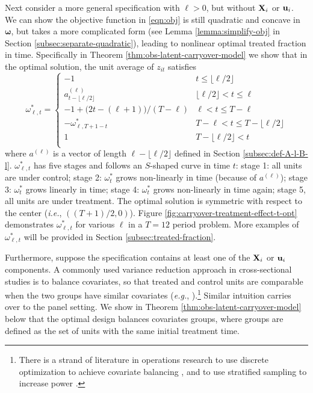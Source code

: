 {	

Next consider a more general specification with $\ell > 0$, but without $\mathbf{X}_i$ or $\mathbf{u}_i$. We can show the objective function in \eqref{eqn:obj} is still quadratic and concave in $\bm{\omega}$, but takes a more complicated form (see Lemma \ref{lemma:simplify-obj} in Section \ref{subsec:separate-quadratic}), leading to nonlinear optimal treated fraction in time. Specifically in Theorem \ref{thm:obs-latent-carryover-model} we show that in the optimal solution, the unit average of $z_{it}$ satisfies 
%
		\begin{equation}\label{eqn:omega-carryover}
		\omega_{\ell,t}^\ast = \begin{cases}
		-1 & t \leq \lfloor \ell/2 \rfloor \\
		a^{(\ell)}_{t-\lfloor \ell/2 \rfloor} & \lfloor \ell/2 \rfloor < t \leq \ell \\
		-1 + \big(2t - (\ell+1)\big)/(T - \ell)  & \ell < t \leq T - \ell \\
		- \omega^\ast_{\ell,T+1-t} & T - \ell <  t \leq T-\lfloor \ell/2 \rfloor \\
		1 & T-\lfloor \ell/2 \rfloor < t \\
		\end{cases}
		\end{equation}
		where $a^{(\ell)}$ is a vector of length $\ell - \lfloor \ell/2 \rfloor$ defined in Section \ref{subsec:def-A-l-B-l}. $\omega_{\ell,t}^\ast$ has five stages and follows an $S$-shaped curve in time $t$: stage 1:  all units are under control; stage 2: $\omega_t^\ast$ grows non-linearly in time (because of $a^{(\ell)}$); stage 3: $\omega_t^\ast$ grows linearly in time; stage 4: $\omega_t^\ast$ grows non-linearly in time again; stage 5, all units are under treatment. The optimal solution is symmetric with respect to the center ({\it i.e.}, $\left((T+1)/2, 0 \right)$). Figure \ref{fig:carryover-treatment-effect-t-opt} demonstrates $\omega_{\ell,t}^\ast$ for various $\ell$ in a $T=12$ period problem.  More examples of $\omega_{\ell,t}^\ast$ will be provided in Section \ref{subsec:treated-fraction}.
		
	Furthermore, suppose the specification contains at least one of the $\mathbf{X}_i$ or $\mathbf{u}_i$ components. A commonly used variance reduction approach in cross-sectional studies is to balance covariates, so that treated and control units are comparable when the two groups have similar covariates ({\it e.g.}, \cite{imbens2015causal}).\footnote{There is a strand of literature in operations research to use discrete optimization to achieve covariate balancing \citep{nikolaev2013balance,bertsimas2015power,bertsimas2019covariate,bhat2019near}, and to use stratified sampling to increase power \citep{fox2000separability,mulvey1983multivariate}.} Similar intuition carries over to the panel setting. We show in Theorem \ref{thm:obs-latent-carryover-model} below that the optimal design balances covariates groups, where groups are defined as the set of units with the same initial treatment time. 
	
}
